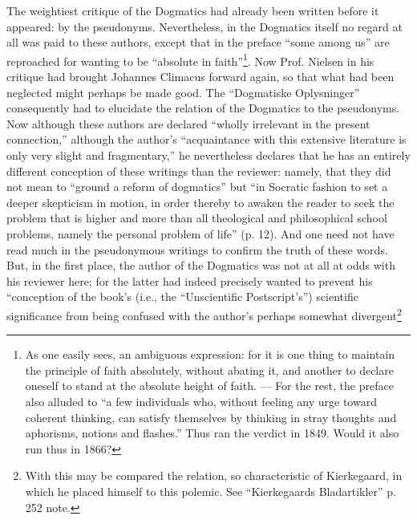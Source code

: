 \documentclass[12pt,a4paper]{book}
\newcommand{\opage}[1]{\marginnote{\footnotesize\textit{[#1]}}}
\begin{document}
The weightiest critique of the Dogmatics had already been written
before it appeared: by the pseudonyms. Nevertheless, in
the Dogmatics itself no regard at all was paid to these authors,
except that in the preface ``some among
us'' are reproached for wanting to be ``absolute in faith''\footnote{As one easily sees, an ambiguous expression: for it is one thing to maintain
the principle of faith absolutely, without abating it, and another to declare
oneself to stand at the absolute height of faith. --- For the rest,
the preface also alluded to ``a few individuals who, without feeling
any urge toward coherent thinking, can satisfy themselves by
thinking in stray thoughts and aphorisms, notions and flashes.'' Thus
ran the verdict in 1849. Would it also run thus in 1866?}. Now Prof.
Nielsen in his critique had brought Johannes Climacus forward again, so
that what had been neglected might perhaps be made good. The ``Dogmatiske
Oplysninger'' consequently had to elucidate the relation of the Dogmatics to
the pseudonyms. Now although these authors are declared ``wholly
irrelevant in the present connection,'' although the author's
\opage{32}\setcounter{footnote}{0}%
``acquaintance with this extensive literature is only very slight
and fragmentary,'' he nevertheless declares that he has an entirely
different conception of these writings than the reviewer: namely, that
they did not mean to ``ground a reform of dogmatics'' but ``in
Socratic fashion to set a deeper skepticism in motion, in order
thereby to awaken the reader to seek the problem that is
higher and more than all theological and philosophical school problems,
namely the personal problem of life'' (p. 12). And
one need not have read much in the pseudonymous writings
to confirm the truth of these words. But, in the first place, the author of
the Dogmatics was not at all at odds with his reviewer here; for the latter
had indeed precisely wanted to prevent his ``conception of the book's
(i.e., the ``Unscientific Postscript's'') scientific significance from being confused
with the author's perhaps somewhat divergent\footnote{With this may be compared the relation, so characteristic of Kierkegaard,
in which he placed himself to this polemic. See ``Kierkegaards
Bladartikler'' p. 252 note.}
\end{document}
